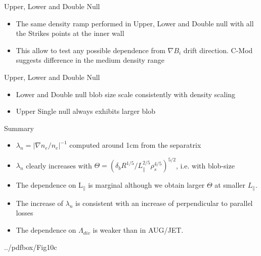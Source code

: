 \documentclass[10pt, compress]{beamer}
\newcommand\Fontvi{\fontsize{8}{7.2}\selectfont}
\begin{document}
\begin{frame}{Upper, Lower and Double Null}
    \Fontvi
    \begin{itemize}
      \item The same density ramp performed in Upper, Lower and Double
        null with all the Strikes points at the inner wall
      \item This allow to test any possible dependence from $\nabla
        B_i$ drift direction. C-Mod suggests difference in the medium
        density range \parencite{LaBombard:2004kg}
    \end{itemize}
\end{frame}
\begin{frame}{Upper, Lower and Double Null}
    \Fontvi
    \begin{itemize}
      \item<2-> Lower and Double null blob size scale consistently with
        density scaling
      \item<3->  Upper Single null always exhibits
        larger blob
      \end{itemize}
      \vspace{-0.27cm}
\end{frame}  

\begin{frame}{Summary}
  \Fontvi
  \begin{itemize}
  \item<1-> $\lambda_n = |\nabla n_e/n_e|^{-1}$ computed around 1cm from the
    separatrix
  \item<2-> $\lambda_n$ clearly increases with $\Theta = (\delta_b
        R^{1/5}/L_{\parallel}^{2/5}\rho_s^{4/5})^{5/2}$,
    i.e. with blob-size
  \item<3-> \alert{The dependence on L$_{\parallel}$ is marginal
      although we obtain 
      larger $\Theta$ at smaller $L_{\parallel}$}.
  \item<4-> The increase of $\lambda_n$ is consistent with an increase
    of perpendicular to parallel losses
  \item<5-> The dependence on $\Lambda_{div}$ is weaker than in
    AUG/JET. 
      
  \end{itemize}
  \begin{tikzonimage}[width=\textwidth]{../pdfbox/Fig10c}
    \end{tikzonimage}
\end{frame}
\end{document}
